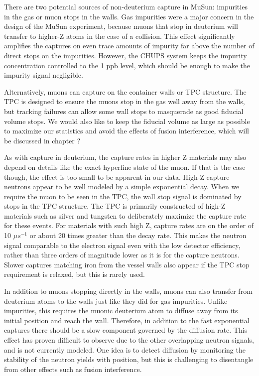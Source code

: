 There are two potential sources of non-deuterium capture in MuSun: impurities in the gas or muon stops in the walls.
Gas impurities were a major concern in the design of the MuSun experiment, because muons that stop in deuterium will transfer to higher-Z atoms in the case of a collision.
This effect significantly amplifies the captures on even trace amounts of impurity far above the number of direct stops on the impurities.  
However, the CHUPS system keeps the impurity concentration controlled to the 1 ppb level, which should be enough to make the impurity signal negligible.

Alternatively, muons can capture on the container walls or TPC structure.
The TPC is designed to ensure the muons stop in the gas well away from the walls, but tracking failures can allow some wall stops to masquerade as good fiducial volume stops.
We would also like to keep the fiducial volume as large as possible to maximize our statistics and avoid the effects of fusion interference, which will be discussed in chapter ?

As with capture in deuterium, the capture rates in higher Z materials may also depend on details like the exact hyperfine state of the muon.
If that is the case though, the effect is too small to be apparent in our data.
High-Z capture neutrons appear to be well modeled by a simple exponential decay.
When we require the muon to be seen in the TPC, the wall stop signal is dominated by stops in the TPC structure.
The TPC is primarily constructed of high-Z materials such as silver and tungsten to deliberately maximize the capture rate for these events.
For materials with such high Z, capture rates are on the order of 10 $\mu s^{-1}$ or about 20 times greater than the decay rate. 
This makes the neutron signal comparable to the electron signal even with the low detector efficiency, rather than three orders of magnitude lower as it is for the capture neutrons.
Slower captures matching iron from the vessel walls also appear if the TPC stop requirement is relaxed, but this is rarely used.

In addition to muons stopping directly in the walls, muons can also transfer from deuterium atoms to the walls just like they did for gas impurities.
Unlike impurities, this requires the muonic deuterium atom to diffuse away from its initial position and reach the wall.
Therefore, in addition to the fast exponential captures there should be a slow component governed by the diffusion rate.
This effect has proven difficult to observe due to the other overlapping neutron signals, and is not currently modeled.
One idea is to detect diffusion by monitoring the stability of the neutron yields with position, but this is challenging to disentangle from other effects such as fusion interference.

